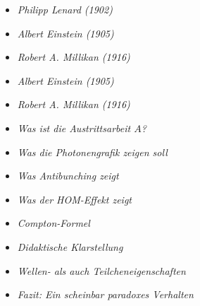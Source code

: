 \vspace{1em}
\begin{tcolorbox}[title=physikalische Boxen,physikbox]
\begin{itemize}
	\item \emph{Philipp Lenard (1902)}\dotfill\pageref{box:Philipp Lenhard}
	\item \emph{Albert Einstein (1905)} \dotfill\pageref{die Erzeuguung von Licht}
	\item \emph{Robert A. Millikan (1916)} \dotfill\pageref{box:Robert A, Millikan}
	\item \emph{Albert Einstein (1905)}\dotfill\pageref{die Erscheinung der Wärm}
	\item \emph{Robert A. Millikan (1916)} \dotfill\pageref{box:einsteins gleichung passt}
	\item \emph{Was ist die Austrittsarbeit \( A \)?} \dotfill\pageref{bos:was ist Austrittsarbeit}
	\item \emph{Was die Photonengrafik zeigen soll} \dotfill\pageref{box:was die photonengrafik}
	\item \emph{Was Antibunching zeigt} \dotfill\pageref{box:wasAntibunching}
	\item \emph{Was der HOM-Effekt zeigt} \dotfill\pageref{box:HOM-Effekt}
\end{itemize}
\end{tcolorbox}

\vspace{1em}
\begin{tcolorbox}[title=mathematische Boxen,mathebox]

\begin{itemize}
	\item \emph{Compton-Formel} \dotfill\pageref{box:comptonFormel}
\end{itemize}
\end{tcolorbox}

\vspace{1em}
\begin{tcolorbox}[title=didaktische Boxen,didaktikbox]
\begin{itemize}
	\item \emph{Didaktische Klarstellung}\dotfill\pageref{box:didaktischeKlarstellung}
	\item \emph{Wellen- als auch Teilcheneigenschaften} \dotfill\pageref{box:wellen}
	\item \emph{Fazit: Ein scheinbar paradoxes Verhalten} \dotfill\pageref{box:Fazit ein scheinbarer}
\end{itemize}
\end{tcolorbox}


